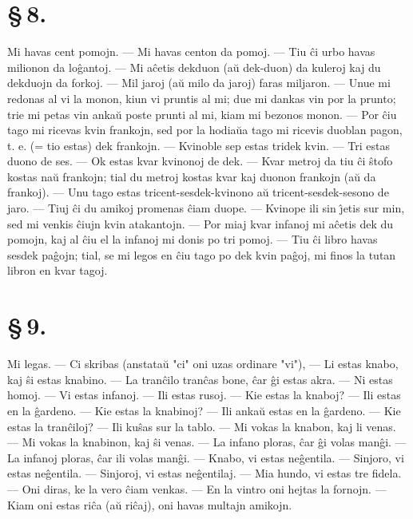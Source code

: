 \section*{\S\,8.}
Mi havas cent pomojn. --- Mi havas centon da pomoj. --- Tiu \^ci
urbo havas milionon da lo\^gantoj. --- Mi a\^cetis dekduon (a\u u
dek-duon) da kuleroj kaj du dekduojn da forkoj. --- Mil jaroj (a\u u
milo da jaroj) faras miljaron. --- Unue mi redonas al vi la monon,
kiun vi pruntis al mi; due mi dankas vin por la prunto; trie mi
petas vin anka\u u poste prunti al mi, kiam mi bezonos monon. ---
Por \^ciu tago mi ricevas kvin frankojn, sed por la hodia\u ua tago
mi ricevis duoblan pagon, t. e. (= tio estas) dek frankojn.
--- Kvinoble sep estas tridek kvin. --- Tri estas duono de ses. --- Ok
estas kvar kvinonoj de dek. --- Kvar metroj da tiu \^ci \^stofo
kostas na\u u frankojn; tial du metroj kostas kvar kaj duonon
frankojn (a\u u da frankoj). --- Unu tago estas
tricent-sesdek-kvinono a\u u tricent-sesdek-sesono de jaro. --- Tiuj
\^ci du amikoj promenas \^ciam duope. --- Kvinope ili sin \^{\j}etis
sur min, sed mi venkis \^ciujn kvin atakantojn. --- Por miaj kvar
infanoj mi a\^cetis dek du pomojn, kaj al \^ciu el la infanoj mi
donis po tri pomoj. --- Tiu \^ci libro havas sesdek pa\^gojn; tial,
se mi legos en \^ciu tago po dek kvin pa\^goj, mi finos la tutan
libron en kvar tagoj.


\section*{\S\,9.}
 Mi legas. --- Ci skribas (anstata\u u "ci" oni uzas ordinare "vi"),
 --- Li estas knabo, kaj \^si estas knabino. --- La tran\^cilo tran\^cas
bone, \^car \^gi estas akra. --- Ni estas homoj. --- Vi estas
infanoj. --- Ili estas rusoj. --- Kie estas la knaboj? --- Ili estas
en la \^gardeno. --- Kie estas la knabinoj? --- Ili anka\u u estas
en la \^gardeno. --- Kie estas la tran\^ciloj? --- Ili ku\^sas sur
la tablo. --- Mi vokas la knabon, kaj li venas. --- Mi vokas la
knabinon, kaj \^si venas. --- La infano ploras, \^car \^gi volas
man\^gi. --- La infanoj ploras, \^car ili volas man\^gi. --- Knabo,
vi estas ne\^gentila. --- Sinjoro, vi estas ne\^gentila.
--- Sinjoroj, vi estas ne\^gentilaj. --- Mia hundo, vi estas tre
fidela. --- Oni diras, ke la vero \^ciam venkas. --- En la vintro
oni hejtas la fornojn. --- Kiam oni estas ri\^ca (a\u u ri\^caj),
oni havas multajn amikojn.

